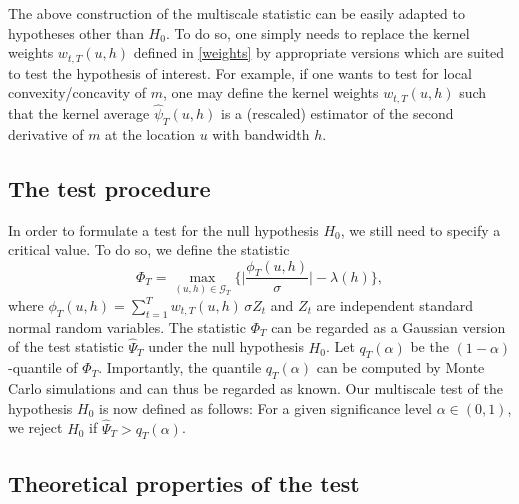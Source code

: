 \begin{remark}
The above construction of the multiscale statistic can be easily adapted to hypotheses other than $H_0$. To do so, one simply needs to replace the kernel weights $w_{t,T}(u,h)$ defined in \eqref{weights} by appropriate versions which are suited to test the hypothesis of interest. For example, if one wants to test for local convexity/concavity of $m$, one may define the kernel weights $w_{t,T}(u,h)$ such that the kernel average $\widehat{\psi}_T(u,h)$ is a (rescaled) estimator of the second derivative of $m$ at the location $u$ with bandwidth $h$. 
\end{remark}


\subsection{The test procedure}\label{subsec-method-test}


In order to formulate a test for the null hypothesis $H_0$, we still need to specify a critical value. To do so, we define the statistic
\begin{equation}\label{Phi-statistic}
\Phi_T = \max_{(u,h) \in \mathcal{G}_T} \Big\{ \Big|\frac{\phi_T(u,h)}{\sigma}\Big| - \lambda(h) \Big\},
\end{equation} 
where $\phi_T(u,h) = \sum\nolimits_{t=1}^T w_{t,T}(u,h) \, \sigma Z_t$ and $Z_t$ are independent standard normal random variables. The statistic $\Phi_T$ can be regarded as a Gaussian version of the test statistic $\widehat{\Psi}_T$ under the null hypothesis $H_0$. Let $q_T(\alpha)$ be the $(1-\alpha)$-quantile of $\Phi_T$. Importantly, the quantile $q_T(\alpha)$ can be computed by Monte Carlo simulations and can thus be regarded as known. Our multiscale test of the hypothesis $H_0$ is now defined as follows: For a given significance level $\alpha \in (0,1)$, we reject $H_0$ if $\widehat{\Psi}_T > q_T(\alpha)$. 


\subsection{Theoretical properties of the test}\label{subsec-method-theo}


